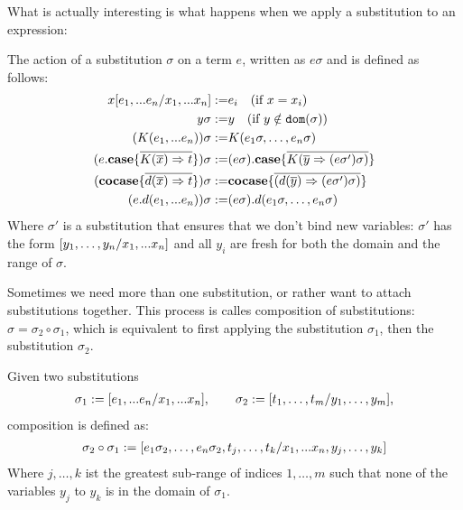 \documentclass[twoside,12pt,a4paper]{article}
\begin{document}
What is actually interesting is what happens when we apply a substitution to an expression:

\begin{definition}
    The action of a substitution $\sigma$ on a term $e$, written as $e \sigma$ and is defined as follows:
    \begin{align*}
        x[e_1,...e_n / x_1,...x_n] :=& e_i \quad(\text{if } x=x_i) \\
        y\sigma :=& y\quad (\text{if }y\notin \texttt{dom}(\sigma))\\
        (K(e_1,...e_n))\sigma :=& K(e_1 \sigma,\dots , e_n \sigma)\\
        (e.\textbf{case}\{\overline{K(\overline{x})\Rightarrow t}\})\sigma:=& (e\sigma).\textbf{case}\{\overline{K(\overline{y}\Rightarrow (e\sigma')\sigma)}\}\\
        (\textbf{cocase}\{\overline{d(\overline{x})\Rightarrow t}\})\sigma:=& \textbf{cocase}\{\overline{(d(\overline{y})\Rightarrow(e\sigma')\sigma)}\}\\
        (e.d(e_1,...e_n)) \sigma:=& (e \sigma).d(e_1 \sigma,\dots , e_n \sigma)
    \end{align*} 
    Where $\sigma'$ is a substitution that ensures that we don't bind new variables: 
    $\sigma'$ has the form $[y_1,\dots, y_n/x_1,...x_n]$ and all $y_i$ are fresh for both the domain and the range of $\sigma$.
\end{definition}


Sometimes we need more than one substitution, or rather want to attach substitutions together.
This process is calles composition of substitutions: $\sigma = \sigma_2 \circ \sigma_1$, which is equivalent to first applying the substitution $\sigma_1$, then the substitution $\sigma_2$.

\begin{definition}
    Given two substitutions
    \begin{align*}
        \sigma_1 := [e_1,...e_n/x_1,...x_n],\qquad \sigma_2 := [t_1,\dots,t_m/y_1,\dots,y_m],
    \end{align*}
    composition is defined as:
    \begin{align*}
        \sigma_2\circ\sigma_1 := [e_1\sigma_2,\dots,e_n\sigma_2,t_j,\dots,t_k/x_1,...x_n,y_j,\dots,y_k]
    \end{align*}
    Where $j, \dots, k$ ist the greatest sub-range of indices $1,\dots,m$ such that none of the variables $y_j$ to $y_k$ is in the domain of $\sigma_1$. 
\end{definition}
\end{document}
